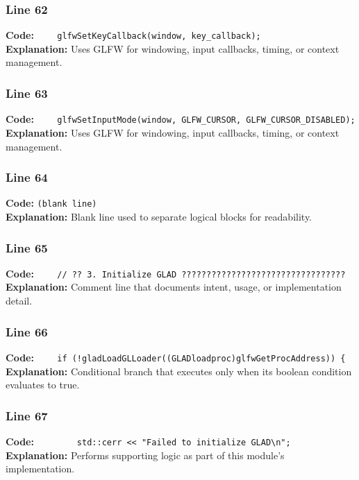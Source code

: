 \documentclass[11pt,a4paper]{article}
\begin{document}
\subsubsection*{Line 62}
\textbf{Code:} \verb|    glfwSetKeyCallback(window, key_callback);|\\
\textbf{Explanation:} Uses GLFW for windowing, input callbacks, timing, or context management.

\subsubsection*{Line 63}
\textbf{Code:} \verb|    glfwSetInputMode(window, GLFW_CURSOR, GLFW_CURSOR_DISABLED);|\\
\textbf{Explanation:} Uses GLFW for windowing, input callbacks, timing, or context management.

\subsubsection*{Line 64}
\textbf{Code:} \texttt{(blank line)}\\
\textbf{Explanation:} Blank line used to separate logical blocks for readability.

\subsubsection*{Line 65}
\textbf{Code:} \verb|    // ?? 3. Initialize GLAD ?????????????????????????????????|\\
\textbf{Explanation:} Comment line that documents intent, usage, or implementation detail.

\subsubsection*{Line 66}
\textbf{Code:} \verb|    if (!gladLoadGLLoader((GLADloadproc)glfwGetProcAddress)) {|\\
\textbf{Explanation:} Conditional branch that executes only when its boolean condition evaluates to true.

\subsubsection*{Line 67}
\textbf{Code:} \verb|        std::cerr << "Failed to initialize GLAD\n";|\\
\textbf{Explanation:} Performs supporting logic as part of this module's implementation.
\end{document}
